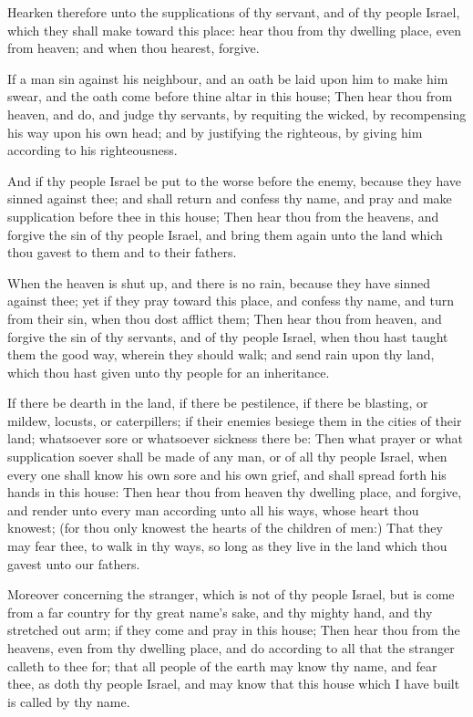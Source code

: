 \Verse Hearken therefore unto the supplications of thy servant, and of thy people Israel, which they shall make toward this place: hear thou from thy dwelling place, even from heaven; and when thou hearest, forgive.

\Verse If a man sin against his neighbour, and an oath be laid upon him to make him swear, and the oath come before thine altar in this house; \Verse Then hear thou from heaven, and do, and judge thy servants, by requiting the wicked, by recompensing his way upon his own head; and by justifying the righteous, by giving him according to his righteousness.

\Verse And if thy people Israel be put to the worse before the enemy, because they have sinned against thee; and shall return and confess thy name, and pray and make supplication before thee in this house; \Verse Then hear thou from the heavens, and forgive the sin of thy people Israel, and bring them again unto the land which thou gavest to them and to their fathers.

\Verse When the heaven is shut up, and there is no rain, because they have sinned against thee; yet if they pray toward this place, and confess thy name, and turn from their sin, when thou dost afflict them; \Verse Then hear thou from heaven, and forgive the sin of thy servants, and of thy people Israel, when thou hast taught them the good way, wherein they should walk; and send rain upon thy land, which thou hast given unto thy people for an inheritance.

\Verse If there be dearth in the land, if there be pestilence, if there be blasting, or mildew, locusts, or caterpillers; if their enemies besiege them in the cities of their land; whatsoever sore or whatsoever sickness there be: \Verse Then what prayer or what supplication soever shall be made of any man, or of all thy people Israel, when every one shall know his own sore and his own grief, and shall spread forth his hands in this house: \Verse Then hear thou from heaven thy dwelling place, and forgive, and render unto every man according unto all his ways, whose heart thou knowest; (for thou only knowest the hearts of the children of men:) \Verse That they may fear thee, to walk in thy ways, so long as they live in the land which thou gavest unto our fathers.

\Verse Moreover concerning the stranger, which is not of thy people Israel, but is come from a far country for thy great name's sake, and thy mighty hand, and thy stretched out arm; if they come and pray in this house; \Verse Then hear thou from the heavens, even from thy dwelling place, and do according to all that the stranger calleth to thee for; that all people of the earth may know thy name, and fear thee, as doth thy people Israel, and may know that this house which I have built is called by thy name.

